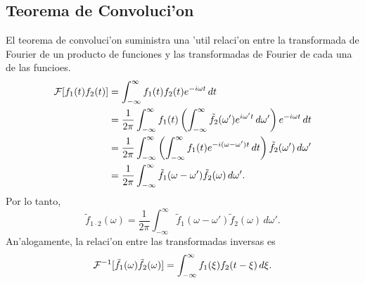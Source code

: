 \subsection{Teorema de Convoluci'on}
El teorema de convoluci'on suministra una 'util relaci'on entre la transformada de Fourier de un producto de funciones y las transformadas de Fourier de cada una de las funcioes.
\begin{align}
{\cal F}[f_1(t)f_2(t)]
 &=\int_{-\infty}^\infty f_1(t)f_2(t) e^{-i\omega t}\,dt \\
 &=\frac{1}{2\pi}\int_{-\infty}^\infty f_1(t) \left(\int_{-\infty}^\infty\tilde{f}_2(\omega')
 e^{i\omega' t}\,d\omega'\right)e^{-i\omega t}\,dt \\
 &=\frac{1}{2\pi}\int_{-\infty}^\infty\left(\int_{-\infty}^\infty f_1(t) 
 e^{-i(\omega-\omega')t}\,dt\right)\tilde{f}_2(\omega')\,d\omega' \\
 &=\frac{1}{2\pi} \int_{-\infty}^\infty\tilde{f}_1(\omega-\omega')\tilde{f}_2(\omega)\,d\omega'.
\end{align}
Por lo tanto, 
\begin{equation}
\boxed{ \tilde{f}_{1\cdot 2}(\omega)=\frac{1}{2\pi} \int_{-\infty}^\infty\tilde{f}_1(\omega-\omega')\tilde{f}_2(\omega)\,d\omega' .
 } 
\end{equation}   
An'alogamente, la relaci'on entre las transformadas inversas es
\begin{equation}
{\cal F}^{-1}[\tilde{f}_1(\omega)\tilde{f}_2(\omega)]
=\int_{-\infty}^\infty f_1(\xi)f_2(t-\xi)\,d\xi .	
\end{equation}



